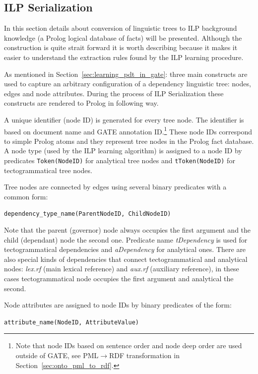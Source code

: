 \subsection{ILP Serialization} \label{sec:learning_ilp_serialization}

In this section details about conversion of linguistic trees to ILP background knowledge (a Prolog logical database of facts) will be presented. Although the construction is quite strait forward it is worth describing because it makes it easier to understand the extraction rules found by the ILP learning procedure. 

As mentioned in Section~\ref{sec:learning_pdt_in_gate}: three main constructs are used to capture an arbitrary configuration of a dependency linguistic tree: nodes, edges and node attributes. During the process of ILP Serialization these constructs are rendered to Prolog in following way. 

A unique identifier (node ID) is generated for every tree node. The identifier is based on document name and GATE annotation ID.\footnote{Note that node IDs based on sentence order and node deep order are used outside of GATE, see PML$\rightarrow$RDF transformation in Section~\ref{sec:onto_pml_to_rdf}.} These node IDs correspond to simple Prolog atoms and they represent tree nodes in the Prolog fact database. A node type (used by the ILP learning algorithm) is assigned to a node ID by predicates \texttt{Token(NodeID)} for analytical tree nodes and \texttt{tToken(NodeID)} for tectogrammatical tree nodes.

Tree nodes are connected by edges using several binary predicates with a common form:

\texttt{dependency\_type\_name(ParentNodeID, ChildNodeID)}

\noindent Note that the parent (governor) node always occupies the first argument and the child (dependant) node the second one. Predicate name \emph{tDependency} is used for tectogrammatical dependencies and \emph{aDependency} for analytical ones. There are also special kinds of dependencies that connect tectogrammatical and analytical nodes: \emph{lex.rf} (main lexical reference) and \emph{aux.rf} (auxiliary reference), in these cases tectogrammatical node occupies the first argument and analytical the second.

Node attributes are assigned to node IDs by binary predicates of the form:

\texttt{attribute\_name(NodeID, AttributeValue)}

